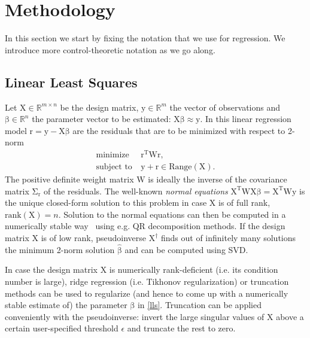 \documentclass[10pt,a4paper]{article}
\newcommand{\boldvec}[1]{\boldsymbol{\mathrm{#1}}}
\let\vec\boldvec
\newcommand{\designMat}{\vec{X}} %
\newcommand{\observations}{\vec{y}} %
\newcommand{\param}{\vec{\beta}} %
\newcommand{\residual}{\vec{r}} %
\newcommand{\weightingMat}{\vec{W}} %
\newcommand{\covarRes}{\vec{\Sigma}_{\residual}} %
\newcommand{\threshold}{\epsilon}
\begin{document}
\section{Methodology}\label{methodology}

In this section we start by fixing the notation that we use for regression. We introduce more control-theoretic notation as we go along.
%
\subsection{Linear Least Squares}
Let $\designMat \in \mathbb{R}^{m \times n}$ be the design matrix, $\observations \in \mathbb{R}^{m}$ the vector of observations and  $\param \in \mathbb{R}^{n}$ the parameter vector to be estimated: $\designMat\param \approx \observations$. In this linear regression model $\residual = \observations - \designMat\param$ are the residuals that are to be minimized with respect to 2-norm~\cite{Golub80}
%
\begin{equation}
\begin{aligned}
\text{minimize} &\ \residual^{\mathrm{T}}\weightingMat\residual, \\
\text{subject to} &\ \observations + \residual \in \text{Range}(\designMat).
\end{aligned}
\label{lls}
\end{equation}
%
\noindent The positive definite weight matrix $\weightingMat$ is ideally the inverse of the covariance matrix $\covarRes$ of the residuals. The well-known \emph{normal equations} $\designMat^{\mathrm{T}}\weightingMat\designMat \param = \designMat^{\mathrm{T}} \weightingMat\observations$ is the unique closed-form solution to this problem in case $\designMat$ is of full rank, $\text{rank}(\designMat) = n$. Solution to the normal equations can then be computed in a numerically stable way~\cite{Golub96} using e.g. QR decomposition methods. If the design matrix $\designMat$ is of low rank, pseudoinverse $\designMat^{\dagger}$ finds out of infinitely many solutions the minimum 2-norm solution $\hat{\param}$ and can be computed using SVD. %

In case the design matrix $\designMat$ is numerically rank-deficient (i.e. its condition number is large), ridge regression (i.e. Tikhonov regularization) or truncation methods can be used to regularize (and hence to come up with a numerically stable estimate of) the parameter $\param$ in \eqref{lls}. Truncation can be applied conveniently with the pseudoinverse: invert the large singular values of $\designMat$ above a certain user-specified threshold $\threshold$ and truncate the rest to zero.
\end{document}
